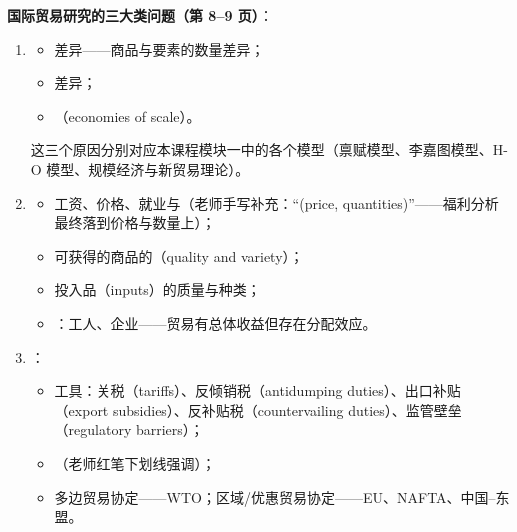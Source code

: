 \textbf{国际贸易研究的三大类问题（第 8--9 页）}：
\begin{enumerate}
  \item {}
    \begin{itemize}
      \item {}差异——商品与要素的数量差异；
      \item {}差异；
      \item {}（economies of scale）。
    \end{itemize}
    这三个原因分别对应本课程模块一中的各个模型（禀赋模型、李嘉图模型、H-O 模型、规模经济与新贸易理论）。
  \item {}
    \begin{itemize}
      \item 工资、价格、就业与（老师手写补充：``(price, quantities)''——福利分析最终落到价格与数量上）；
      \item 可获得的商品的（quality and variety）；
      \item 投入品（inputs）的质量与种类；
      \item {}：工人、企业——贸易有总体收益但存在分配效应。
    \end{itemize}
  \item {}：
    \begin{itemize}
      \item 工具：关税（tariffs）、反倾销税（antidumping duties）、出口补贴（export subsidies）、反补贴税（countervailing duties）、监管壁垒（regulatory barriers）；
      \item {}（老师红笔下划线强调）；
      \item 多边贸易协定——WTO；区域/优惠贸易协定——EU、NAFTA、中国--东盟。
    \end{itemize}
\end{enumerate}


